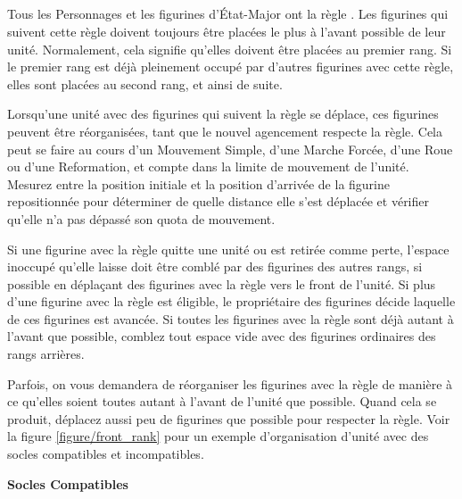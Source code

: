\newpage
\subsection{}
\label{front_rank}

Tous les Personnages et les figurines d'État-Major ont la règle \frontrank{}. Les figurines qui suivent cette règle doivent toujours être placées le plus à l'avant possible de leur unité. Normalement, cela signifie qu'elles doivent être placées au premier rang. Si le premier rang est déjà pleinement occupé par d'autres figurines avec cette règle, elles sont placées au second rang, et ainsi de suite.

Lorsqu'une unité avec des figurines qui suivent la règle \frontrank{} se déplace, ces figurines peuvent être réorganisées, tant que le nouvel agencement respecte la règle. Cela peut se faire au cours d'un Mouvement Simple, d'une Marche Forcée, d'une Roue ou d'une Reformation, et compte dans la limite de mouvement de l'unité. Mesurez entre la position initiale et la position d'arrivée de la figurine repositionnée pour déterminer de quelle distance elle s'est déplacée et vérifier qu'elle n'a pas dépassé son quota de mouvement.

Si une figurine avec la règle \frontrank{} quitte une unité ou est retirée comme perte, l'espace inoccupé qu'elle laisse doit être comblé par des figurines des autres rangs, si possible en déplaçant des figurines avec la règle \frontrank{} vers le front de l'unité. Si plus d'une figurine avec la règle \frontrank{} est éligible, le propriétaire des figurines décide laquelle de ces figurines est avancée. Si toutes les figurines avec la règle \frontrank{} sont déjà autant à l'avant que possible, comblez tout espace vide avec des figurines ordinaires des rangs arrières.

Parfois, on vous demandera de réorganiser les figurines avec la règle \frontrank{} de manière à ce qu'elles soient toutes autant à l'avant de l'unité que possible. Quand cela se produit, déplacez aussi peu de figurines que possible pour respecter la règle. Voir la figure \ref{figure/front_rank} pour un exemple d'organisation d'unité avec des socles compatibles et incompatibles.

\noindent\textbf{Socles Compatibles}

